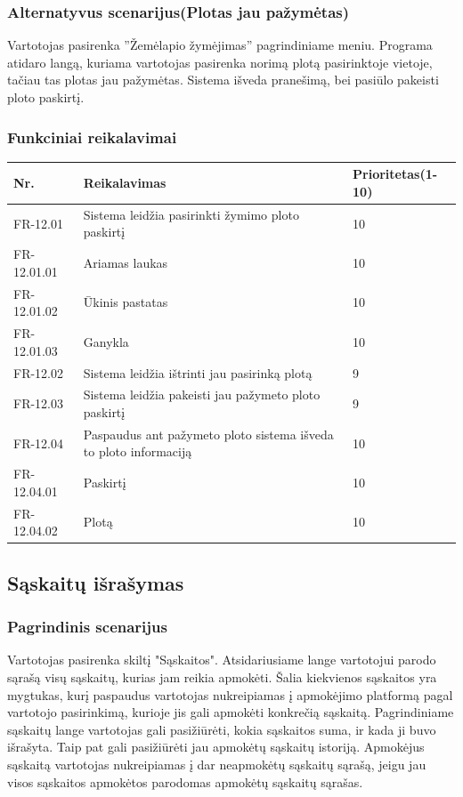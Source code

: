 \documentclass[oneside]{VUMIFPSkursinis}
\begin{document}
	\subsubsection{Alternatyvus scenarijus(Plotas jau pažymėtas)}
	Vartotojas pasirenka ''Žemėlapio žymėjimas'' pagrindiniame meniu. Programa atidaro langą, kuriama vartotojas pasirenka norimą plotą pasirinktoje vietoje, tačiau tas plotas jau pažymėtas. Sistema išveda pranešimą, bei pasiūlo pakeisti ploto paskirtį.
	\subsubsection{Funkciniai reikalavimai}
	\begin{table}[htbp]
		\begin{tabularx}{1\textwidth}{ |P{2.5cm}|X|P{3cm }| }  \hline
			Nr. & Reikalavimas & Prioritetas(1-10) \\ \hline
			FR-12.01 & Sistema leidžia pasirinkti žymimo ploto paskirtį & 10 \\ \hline
			FR-12.01.01 & Ariamas laukas & 10 \\ \hline
			FR-12.01.02 & Ūkinis pastatas & 10 \\ \hline
			FR-12.01.03 & Ganykla & 10 \\ \hline
			FR-12.02 & Sistema leidžia ištrinti jau pasirinką plotą & 9 \\ \hline
			FR-12.03 & Sistema leidžia pakeisti jau pažymeto ploto paskirtį & 9 \\ \hline
			FR-12.04 & Paspaudus ant pažymeto ploto sistema išveda to ploto informaciją & 10 \\ \hline
			FR-12.04.01 & Paskirtį & 10 \\ \hline
			FR-12.04.02 & Plotą & 10 \\ \hline			
		\end{tabularx}
	\end{table}
\subsection{Sąskaitų išrašymas}
	\subsubsection{Pagrindinis scenarijus}
	Vartotojas pasirenka skiltį "Sąskaitos". Atsidariusiame lange vartotojui parodo sąrašą visų sąskaitų, kurias jam reikia apmokėti. Šalia kiekvienos sąskaitos yra mygtukas, kurį paspaudus vartotojas nukreipiamas į apmokėjimo platformą pagal vartotojo pasirinkimą, kurioje jis gali apmokėti konkrečią sąskaitą. Pagrindiniame sąskaitų lange vartotojas gali pasižiūrėti, kokia sąskaitos suma, ir kada ji buvo išrašyta. Taip pat gali pasižiūrėti jau apmokėtų sąskaitų istoriją. Apmokėjus sąskaitą vartotojas nukreipiamas į dar neapmokėtų sąskaitų sąrašą, jeigu jau visos sąskaitos apmokėtos parodomas apmokėtų sąskaitų sąrašas.
\end{document}
